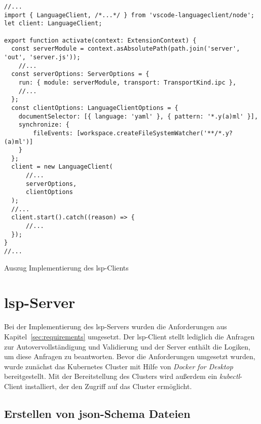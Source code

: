 \begin{listing}[htp]
      \begin{verbatim}
//...
import { LanguageClient, /*...*/ } from 'vscode-languageclient/node';
let client: LanguageClient;
      
export function activate(context: ExtensionContext) {
  const serverModule = context.asAbsolutePath(path.join('server', 'out', 'server.js'));
    //...
  const serverOptions: ServerOptions = {
    run: { module: serverModule, transport: TransportKind.ipc },
    //...
  };
  const clientOptions: LanguageClientOptions = {
    documentSelector: [{ language: 'yaml' }, { pattern: '*.y(a)ml' }],
    synchronize: {
        fileEvents: [workspace.createFileSystemWatcher('**/*.y?(a)ml')]
    }
  };
  client = new LanguageClient(
      //...
      serverOptions,
      clientOptions
  );
  //...
  client.start().catch((reason) => {
      //...
  });
}
//...
      \end{verbatim}
      \caption{Auszug Implementierung des \acs{lsp}-Clients}
      \label{lst:client-code}
\end{listing}

\section{\acs{lsp}-Server}

Bei der Implementierung des \ac{lsp}-Servers wurden die Anforderungen aus Kapitel~\ref{sec:requirements} umgesetzt.
Der \acs{lsp}-Client stellt lediglich die Anfragen zur Autovervollständigung und Validierung und der Server enthält die Logiken,
um diese Anfragen zu beantworten.
Bevor die Anforderungen umgesetzt wurden, wurde zunächst das Kubernetes Cluster
mit Hilfe von \textit{Docker for Desktop} bereitgestellt. Mit der Bereitstellung des Clusters wird außerdem
ein \textit{kubectl}-Client installiert, der den Zugriff auf das Cluster ermöglicht.

\subsection{Erstellen von \acs{json}-Schema Dateien}

